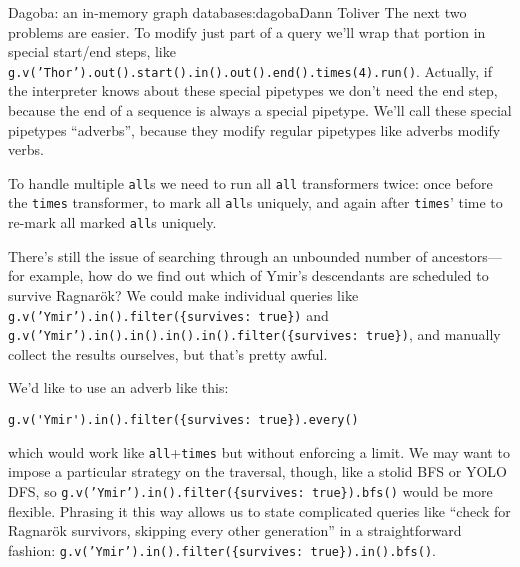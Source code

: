 \begin{aosachapter}{Dagoba: an in-memory graph database}{s:dagoba}{Dann Toliver}
The next two problems are easier. To modify just part of a query we'll
wrap that portion in special start/end steps, like
\texttt{g.v('Thor').out().start().in().out().end().times(4).run()}.
Actually, if the interpreter knows about these special pipetypes we
don't need the end step, because the end of a sequence is always a
special pipetype. We'll call these special pipetypes ``adverbs'',
because they modify regular pipetypes like adverbs modify verbs.

To handle multiple \texttt{all}s we need to run all \texttt{all}
transformers twice: once before the \texttt{times} transformer, to mark
all \texttt{all}s uniquely, and again after \texttt{times}' time to
re-mark all marked \texttt{all}s uniquely.

There's still the issue of searching through an unbounded number of
ancestors---for example, how do we find out which of Ymir's descendants
are scheduled to survive Ragnarök? We could make individual queries like
\texttt{g.v('Ymir').in().filter(\{survives: true\})} and
\newline \texttt{g.v('Ymir').in().in().in().in().filter(\{survives: true\})},
and manually collect the results ourselves, but that's pretty awful.

We'd like to use an adverb like this:

\begin{verbatim}
g.v('Ymir').in().filter({survives: true}).every()
\end{verbatim}

which would work like \texttt{all}+\texttt{times} but without enforcing
a limit. We may want to impose a particular strategy on the traversal,
though, like a stolid BFS or YOLO DFS, so
\newline \texttt{g.v('Ymir').in().filter(\{survives: true\}).bfs()}
would be more flexible. Phrasing it this way allows us to state
complicated queries like ``check for Ragnarök survivors, skipping every
other generation'' in a straightforward fashion:
\texttt{g.v('Ymir').in().filter(\{survives: true\}).in().bfs()}.

\label{wrapping-up}


\end{aosachapter}

